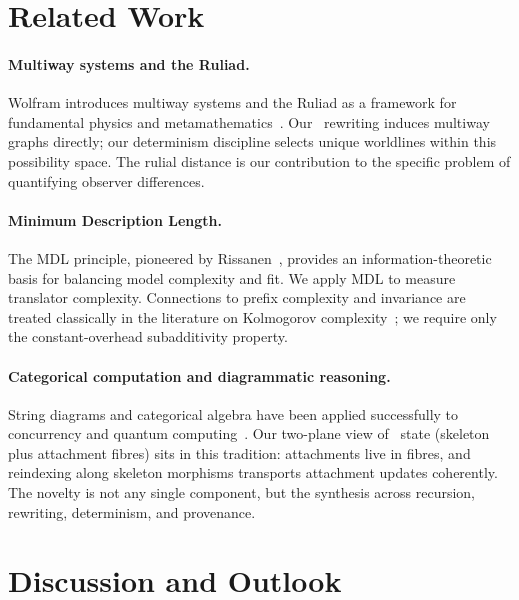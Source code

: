 \documentclass{aion}
\providecommand{\sectionbreak}{\clearpage}
\begin{document}
\sectionbreak

\section{Related Work}
\label{sec:related}

\paragraph{Multiway systems and the Ruliad.}
Wolfram introduces multiway systems and the Ruliad as a framework for fundamental physics and metamathematics~\cite{Wolfram2020}.
Our \WARP\ rewriting induces multiway graphs directly; our determinism discipline selects unique worldlines within this possibility space.
The rulial distance is our contribution to the specific problem of quantifying observer differences.

\paragraph{Minimum Description Length.}
The MDL principle, pioneered by Rissanen~\cite{Ris78}, provides an information-theoretic basis for balancing model complexity and fit.
We apply MDL to measure translator complexity. Connections to prefix complexity and invariance are treated classically in the literature on
Kolmogorov complexity~\cite{LiVitanyi2019}; we require only the constant-overhead subadditivity property.

\paragraph{Categorical computation and diagrammatic reasoning.}
String diagrams and categorical algebra have been applied successfully to concurrency and quantum computing~\cite{CD11}.
Our two-plane view of \WARP\ state (skeleton plus attachment fibres) sits in this tradition: attachments live in fibres, and reindexing along skeleton morphisms
transports attachment updates coherently. The novelty is not any single component, but the synthesis across recursion, rewriting, determinism, and provenance.

\sectionbreak

\section{Discussion and Outlook}
\label{sec:outlook}
\end{document}

